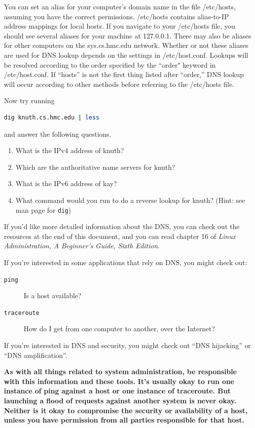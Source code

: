 \documentclass[11pt,a4paper]{article}
\begin{document}
You can set an alias for your computer's domain name in the file /etc/hosts, assuming you have the correct permissions. 
/etc/hosts contains alias-to-IP address mappings for local hosts.
If you navigate to your /etc/hosts file, you should see several aliases for your machine at 127.0.0.1.
There may also be aliases for other computers on the sys.cs.hmc.edu network.
Whether or not these aliases are used for DNS lookup depends on the settings in /etc/host.conf.
Lookups will be resolved according to the order specified by the ``order" keyword in /etc/host.conf. 
If ``hosts'' is not the first thing listed after ``order,'' DNS lookup will occur according to other methods before referring to the /etc/hosts file.

Now try running
\begin{lstlisting}[basicstyle=\ttfamily, backgroundcolor = \color{lightgray}, language = bash, xleftmargin = 0cm, framexleftmargin = 1em]
dig knuth.cs.hmc.edu | less
\end{lstlisting}
and answer the following questions.

\begin{enumerate}
\item What is the IPv4 address of knuth?
\item Which are the authoritative name servers for knuth?
\item What is the IPv6 address of kay?
\item What command would you run to do a reverse lookup for knuth? (Hint: see man page for \verb|dig|)
\end{enumerate}

If you'd like more detailed information about the DNS, you can check out the
resources at the end of this document, and you can read chapter 16 of \textit{
Linux Administration, A Beginner's Guide, Sixth Edition}.

If you're interested in some applications that rely on DNS, you might check out:
\begin{description}
\item[\texttt{ping}] Is a host available?
\item[\texttt{traceroute}] How do I get from one computer to another, over the
Internet?
\end{description}

If you're interested in DNS and security, you might check out ``DNS hijacking''
or ``DNS amplification''.

\textbf{As with all things related to system administration, be responsible with
this information and these tools. It's usually okay to run one instance of ping
against a host or one instance of traceroute. But launching a flood of requests
against another system is never okay. Neither is it okay to compromise the
security or availability of a host, unless you have permission from all parties
responsible for that host.}
\end{document}
